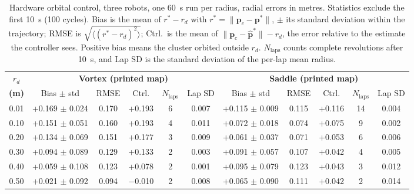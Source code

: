 \begin{table}[!t]
\centering
\footnotesize
\caption{Hardware orbital control, three robots, one 60~s run per radius, radial errors in metres. Statistics exclude the first 10~s (100 cycles). Bias is the mean of $r^* - r_d$ with $r^* = \|\mathbf{p}_c - \mathbf{p}^*\|$, $\pm$ its standard deviation within the trajectory; RMSE is $\sqrt{\langle (r^* - r_d)^2 \rangle}$; Ctrl.\ is the mean of $\|\mathbf{p}_c - \hat{\mathbf{p}}^*\| - r_d$, the error relative to the estimate the controller sees. Positive bias means the cluster orbited outside $r_d$. $N_{\mathrm{laps}}$ counts complete revolutions after 10~s, and Lap SD is the standard deviation of the per-lap mean radius.}
\label{tab:orbital_radius_comparison}
\setlength{\tabcolsep}{3pt}
\begin{tabular}{c|ccccc|ccccc}
\hline
\textbf{$r_d$} & \multicolumn{5}{c|}{\textbf{Vortex (printed map)}} & \multicolumn{5}{c}{\textbf{Saddle (printed map)}} \\
\textbf{(m)} & Bias $\pm$ std & RMSE & Ctrl. & $N_{\mathrm{laps}}$ & Lap SD & Bias $\pm$ std & RMSE & Ctrl. & $N_{\mathrm{laps}}$ & Lap SD \\
\hline
0.01 & +0.169 $\pm$ 0.024 & 0.170 & +0.193 & 6 & 0.007 & +0.115 $\pm$ 0.009 & 0.115 & +0.116 & 14 & 0.004 \\
0.10 & +0.151 $\pm$ 0.051 & 0.160 & +0.193 & 4 & 0.011 & +0.072 $\pm$ 0.018 & 0.074 & +0.075 & 9 & 0.002 \\
0.20 & +0.134 $\pm$ 0.069 & 0.151 & +0.177 & 3 & 0.009 & +0.061 $\pm$ 0.037 & 0.071 & +0.053 & 6 & 0.006 \\
0.30 & +0.094 $\pm$ 0.089 & 0.129 & +0.133 & 2 & 0.003 & +0.091 $\pm$ 0.057 & 0.107 & +0.042 & 4 & 0.005 \\
0.40 & +0.059 $\pm$ 0.108 & 0.123 & +0.078 & 2 & 0.001 & +0.095 $\pm$ 0.079 & 0.123 & +0.043 & 3 & 0.012 \\
0.50 & +0.021 $\pm$ 0.092 & 0.094 & $-$0.010 & 2 & 0.008 & +0.065 $\pm$ 0.090 & 0.111 & +0.042 & 2 & 0.014 \\
\hline
\end{tabular}
\end{table}
